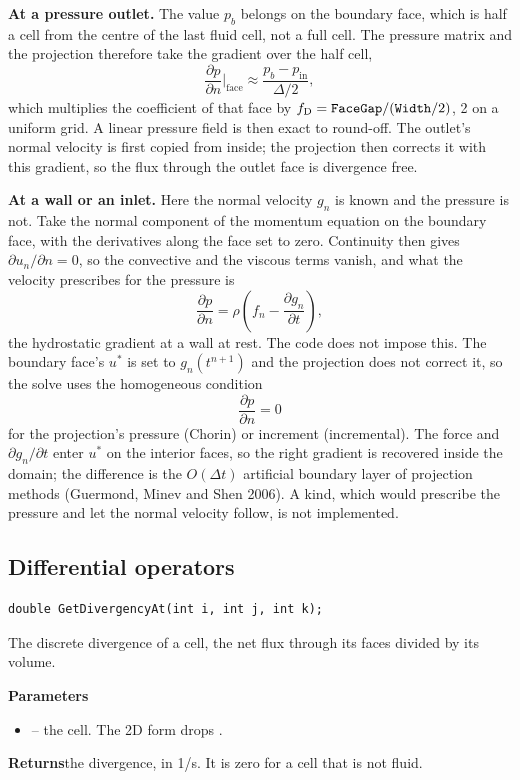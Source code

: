 \documentclass[10pt,a4paper]{article}
\newcommand{\code}[1]{\texttt{\detokenize{#1}}}
\newenvironment{params}{\par\noindent\textbf{Parameters}\begin{itemize}[leftmargin=1.4em,itemsep=0pt,topsep=1pt,parsep=0pt]}{\end{itemize}}
\newcommand{\p}[2]{\item \code{#1} -- #2}
\newcommand{\returns}[1]{\par\noindent\textbf{Returns}\quad #1\par}
\begin{document}
\textbf{At a pressure outlet.} The value $p_b$ belongs on the boundary face, which is half a cell from the centre of
the last fluid cell, not a full cell. The pressure matrix and the projection therefore take the gradient over the
half cell,
\begin{equation*}
  \frac{\partial p}{\partial n}\bigg|_{\mathrm{face}} \approx \frac{p_b - p_{\mathrm{in}}}{\Delta/2},
\end{equation*}
which multiplies the coefficient of that face by $f_{\mathrm{D}} = \code{FaceGap}/(\code{Width}/2)$, 2 on a uniform
grid. A linear pressure field is then exact to round-off. The outlet's normal velocity is first copied from inside;
the projection then corrects it with this gradient, so the flux through the outlet face is divergence free.

\textbf{At a wall or an inlet.} Here the normal velocity $g_n$ is known and the pressure is not. Take the normal
component of the momentum equation on the boundary face, with the derivatives along the face set to zero. Continuity
then gives $\partial u_n/\partial n = 0$, so the convective and the viscous terms vanish, and what the velocity
prescribes for the pressure is
\begin{equation*}
  \frac{\partial p}{\partial n} = \rho\left(f_n - \frac{\partial g_n}{\partial t}\right),
\end{equation*}
the hydrostatic gradient at a wall at rest. The code does not impose this. The boundary face's $u^*$ is set to
$g_n(t^{n+1})$ and the projection does not correct it, so the solve uses the homogeneous condition
\begin{equation*}
  \frac{\partial p}{\partial n} = 0
\end{equation*}
for the projection's pressure (Chorin) or increment (incremental). The force and $\partial g_n/\partial t$ enter
$u^*$ on the interior faces, so the right gradient is recovered inside the domain; the difference is the $O(\Delta t)$
artificial boundary layer of projection methods (Guermond, Minev and Shen 2006). A \code{pressure_inlet} kind, which
would prescribe the pressure and let the normal velocity follow, is not implemented.

\subsection{Differential operators}

\begin{lstlisting}[style=sig]
double GetDivergencyAt(int i, int j, int k);
\end{lstlisting}
The discrete divergence of a cell, the net flux through its faces divided by its volume.
\begin{params}
\p{i, j, k}{the cell. The 2D form drops \code{k}.}
\end{params}
\returns{the divergence, in 1/s. It is zero for a cell that is not fluid.}
\end{document}
